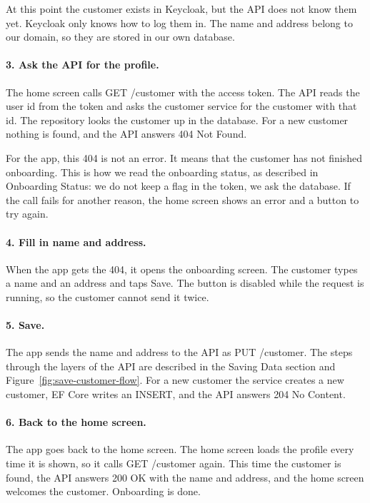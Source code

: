 \documentclass[a4paper,11pt]{article}
\begin{document}
At this point the customer exists in Keycloak, but the API does not know them yet. Keycloak only knows how to log them in. The name and address belong to our domain, so they are stored in our own database.

\paragraph{3. Ask the API for the profile.} The home screen calls GET /customer with the access token. The API reads the user id from the token and asks the customer service for the customer with that id. The repository looks the customer up in the database. For a new customer nothing is found, and the API answers 404 Not Found.

For the app, this 404 is not an error. It means that the customer has not finished onboarding. This is how we read the onboarding status, as described in Onboarding Status: we do not keep a flag in the token, we ask the database. If the call fails for another reason, the home screen shows an error and a button to try again.

\paragraph{4. Fill in name and address.} When the app gets the 404, it opens the onboarding screen. The customer types a name and an address and taps Save. The button is disabled while the request is running, so the customer cannot send it twice.

\paragraph{5. Save.} The app sends the name and address to the API as PUT /customer. The steps through the layers of the API are described in the Saving Data section and Figure~\ref{fig:save-customer-flow}. For a new customer the service creates a new customer, EF Core writes an INSERT, and the API answers 204 No Content.

\paragraph{6. Back to the home screen.} The app goes back to the home screen. The home screen loads the profile every time it is shown, so it calls GET /customer again. This time the customer is found, the API answers 200 OK with the name and address, and the home screen welcomes the customer. Onboarding is done.
\end{document}
